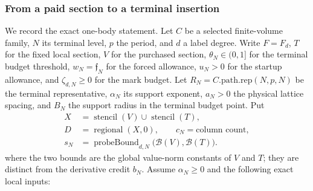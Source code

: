 \subsubsection{From a paid section to a terminal insertion}

We record the exact one-body statement. Let $C$ be a selected finite-volume
family, $N$ its terminal level, $p$ the period, and $d$ a label degree.
Write $F=F_d$, $T$ for the fixed local section, $V$ for the purchased
section, $\theta_N\in(0,1]$ for the terminal budget threshold,
$w_N=\mathfrak f_N$ for the forced allowance, $u_N>0$ for the startup
allowance, and $\zeta_{d,N}\geq0$ for the mark budget. Let
$R_N=C.\mathrm{path.rep}(N,p,N)$ be the terminal representative,
$\alpha_N$ its support exponent, $a_N>0$ the physical lattice spacing, and
$B_N$ the support radius in the terminal budget point. Put
\begin{align*}
 X&=\operatorname{stencil}(V)\cup\operatorname{stencil}(T),\\
 D&=\operatorname{regional}(X,0),\qquad
 c_N=\text{column count},\\
 s_N&=\operatorname{probeBound}_{d,N}\bigl(\mathcal B(V),
                                       \mathcal B(T)\bigr).
\end{align*}
where the two bounds are the global value-norm constants of $V$ and $T$;
they are distinct from the derivative credit $b_N$. Assume
$\alpha_N\geq0$ and the following exact local inputs:

